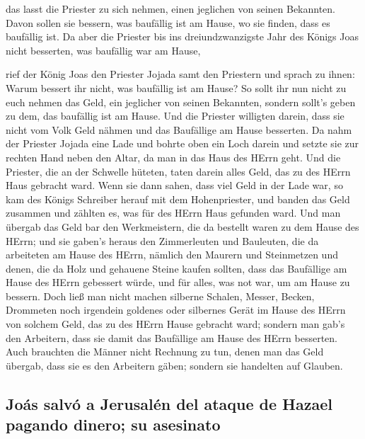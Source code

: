  das lasst die Priester zu sich nehmen, einen jeglichen
von seinen Bekannten. Davon sollen sie bessern, was baufällig ist am
Hause, wo sie finden, dass es baufällig ist.  Da aber die
Priester bis ins dreiundzwanzigste Jahr des Königs Joas nicht besserten,
was baufällig war am Hause,

 rief der König Joas den Priester Jojada samt den
Priestern und sprach zu ihnen: Warum bessert ihr nicht, was baufällig
ist am Hause? So sollt ihr nun nicht zu euch nehmen das Geld, ein
jeglicher von seinen Bekannten, sondern sollt's geben zu dem, das
baufällig ist am Hause.  Und die Priester willigten
darein, dass sie nicht vom Volk Geld nähmen und das Baufällige am Hause
besserten.  Da nahm der Priester Jojada eine Lade und
bohrte oben ein Loch darein und setzte sie zur rechten Hand neben den
Altar, da man in das Haus des HErrn geht. Und die Priester, die an der
Schwelle hüteten, taten darein alles Geld, das zu des HErrn Haus
gebracht ward.  Wenn sie dann sahen, dass viel Geld in
der Lade war, so kam des Königs Schreiber herauf mit dem Hohenpriester,
und banden das Geld zusammen und zählten es, was für des HErrn Haus
gefunden ward.  Und man übergab das Geld bar den
Werkmeistern, die da bestellt waren zu dem Hause des HErrn; und sie
gaben's heraus den Zimmerleuten und Bauleuten, die da arbeiteten am
Hause des HErrn,  nämlich den Maurern und Steinmetzen und
denen, die da Holz und gehauene Steine kaufen sollten, dass das
Baufällige am Hause des HErrn gebessert würde, und für alles, was not
war, um am Hause zu bessern.  Doch ließ man nicht machen
silberne Schalen, Messer, Becken, Drommeten noch irgendein goldenes oder
silbernes Gerät im Hause des HErrn von solchem Geld, das zu des HErrn
Hause gebracht ward;  sondern man gab's den Arbeitern,
dass sie damit das Baufällige am Hause des HErrn besserten.
 Auch brauchten die Männer nicht Rechnung zu tun, denen
man das Geld übergab, dass sie es den Arbeitern gäben; sondern sie
handelten auf Glauben.

\hypertarget{jouxe1s-salvuxf3-a-jerusaluxe9n-del-ataque-de-hazael-pagando-dinero-su-asesinato}{%
\subsection{Joás salvó a Jerusalén del ataque de Hazael pagando dinero;
su
asesinato}\label{jouxe1s-salvuxf3-a-jerusaluxe9n-del-ataque-de-hazael-pagando-dinero-su-asesinato}}

